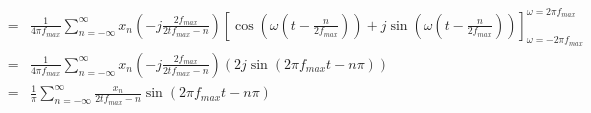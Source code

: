 \documentclass[a4paper]{jsarticle}
\begin{document}
\begin{eqnarray}
	& = & \frac { 1 } { 4 \pi f_{max} } \sum _{ n = - \infty } ^\infty x_n \left( -j \frac { 2 f_{max} } { 2tf_{max} - n } \right) \left[ \cos \left( \omega \left( t - \frac { n } { 2 f_{max} } \right) \right) + j \sin \left( \omega \left( t - \frac { n } { 2 f_{max} } \right) \right) \right] _{ \omega = -2 \pi f_{max} } ^{ \omega = 2 \pi f_{max} } \nonumber \\
	& = & \frac { 1 } { 4 \pi f_{max} } \sum _{ n = - \infty } ^\infty x_n \left( -j \frac { 2 f_{max} } { 2tf_{max} - n } \right) \left( 2 j \sin \left( 2 \pi f_{max} t - n \pi \right) \right) \nonumber \\
	& = & \frac { 1 } { \pi } \sum _{ n = - \infty } ^\infty \frac { x_n } { 2tf_{max} - n } \sin \left( 2 \pi f_{max} t - n \pi \right)
\end{eqnarray}
\end{document}
